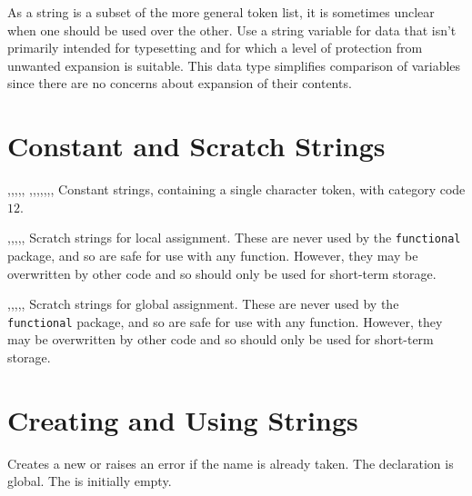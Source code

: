 \documentclass[oneside]{book}
\begin{document}
As a string is a subset of the more general token list, it is sometimes unclear
when one should be used over the other.
Use a string variable for data that isn't primarily intended for typesetting
and for which a level of protection from unwanted expansion is suitable.
This data type simplifies comparison of variables since there are no concerns
about expansion of their contents.


\section{Constant and Scratch Strings}

\begin{variable}{\cAmpersandStr,\cAtsignStr,\cBackslashStr,\cLeftBraceStr,\cRightBraceStr,
\cCircumflexStr,\cColonStr,\cDollarStr,\cHashStr,\cPercentStr,\cTildeStr,\cUnderscoreStr,\cZeroStr}
Constant strings, containing a single character token, with category code $12$.
\end{variable}

\begin{variable}{\lTmpaStr,\lTmpbStr,\lTmpcStr,\lTmpiStr,\lTmpjStr,\lTmpkStr}
Scratch strings for local assignment. These are never used by
the \verb!functional! package, and so are safe for use with any
function. However, they may be overwritten by other
code and so should only be used for short-term storage.
\end{variable}

\begin{variable}{\gTmpaStr,\gTmpbStr,\gTmpcStr,\gTmpiStr,\gTmpjStr,\gTmpkStr}
Scratch strings for global assignment. These are never used by
the \verb!functional! package, and so are safe for use with any
function. However, they may be overwritten by other
code and so should only be used for short-term storage.
\end{variable}

\section{Creating and Using Strings}

\begin{function}{\StrNew}
\begin{syntax}
 
\end{syntax}
Creates a new  or raises an error if the name is
already taken. The declaration is global. The  is
initially empty.
\begin{codehigh}
\StrNew \lFooSomeStr
\end{codehigh}
\end{function}
\end{document}
